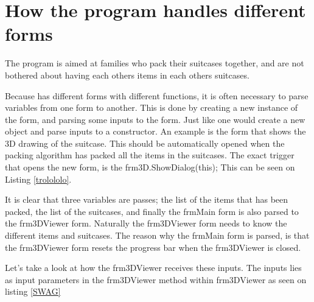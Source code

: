 \section{How the program handles different forms}
The program is aimed at families who pack their suitcases together, and are not bothered about having each others items in each others suitcases. 

Because has different forms with different functions, it is often necessary to parse variables from one form to another. This is done by creating a new instance of the form, and parsing some inputs to the form. Just like one would create a new object and parse inputs to a constructor. An example is the form that shows the 3D drawing of the suitcase. This should be automatically opened when the packing algorithm has packed all the items in the suitcases. The exact trigger that opens the new form, is the frm3D.ShowDialog(this); This can be seen on Listing \ref{trolololo}. 


It is clear that three variables are passes; the list of the items that has been packed, the list of the suitcases, and finally the frmMain form is also parsed to the frm3DViewer form. Naturally the frm3DViewer form needs to know the different items and suitcases. The reason why the frmMain form is parsed, is that the frm3DViewer form resets the progress bar when the frm3DViewer is closed. 

Let's take a look at how the frm3DViewer receives these inputs. The inputs lies as input parameters in the frm3DViewer method within frm3DViewer as seen on listing \ref{SWAG}

